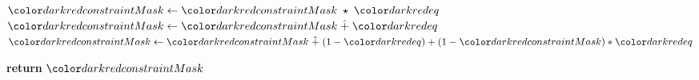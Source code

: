 \begin{algorithm}[H]
\begin{algorithmic}[1]
            \State $\red{constraintMask} \gets \red{constraintMask} \hmul \red{eq}$ 
            \State $\red{constraintMask} \gets \red{constraintMask} \hplus \red{eq}$
            \State $\red{constraintMask} \gets \red{constraintMask} \hplus (1-\red{eq}) + (1-\red{constraintMask}) * \red{eq}$
        \EndIf

    \EndFor

    \State \textbf{return} {$\red{constraintMask}$}
\EndProcedure

\end{algorithmic}
\end{algorithm}

